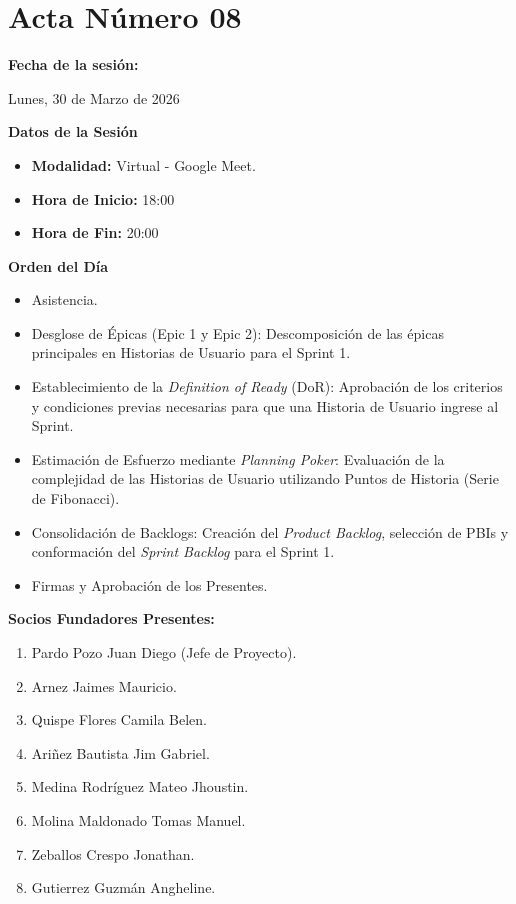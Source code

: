 \newpage
\section{Acta Número 08}
\label{sec:acta08}

\noindent \textbf{Fecha de la sesión:}\par
Lunes, 30 de Marzo de 2026

\vspace*{0.5cm}
\noindent \textbf{Datos de la Sesión}
\vspace{-0.2cm}
\begin{itemize}[noitemsep]
    \item \textbf{Modalidad:} Virtual - Google Meet.
    \item \textbf{Hora de Inicio:} 18:00
    \item \textbf{Hora de Fin:} 20:00
\end{itemize}

\vspace*{0.5cm}
\noindent \textbf{Orden del Día}
\vspace{-0.2cm}
\begin{itemize}[noitemsep]
    \item Asistencia.
    \item Desglose de Épicas (Epic 1 y Epic 2): Descomposición de las épicas principales en Historias de Usuario para el Sprint 1.
    \item Establecimiento de la \textit{Definition of Ready} (DoR): Aprobación de los criterios y condiciones previas necesarias para que una Historia de Usuario ingrese al Sprint.
    \item Estimación de Esfuerzo mediante \textit{Planning Poker}: Evaluación de la complejidad de las Historias de Usuario utilizando Puntos de Historia (Serie de Fibonacci).
    \item Consolidación de Backlogs: Creación del \textit{Product Backlog}, selección de PBIs y conformación del \textit{Sprint Backlog} para el Sprint 1.
    \item Firmas y Aprobación de los Presentes.
\end{itemize}

\vspace*{0.5cm}
\noindent \textbf{Socios Fundadores Presentes:}
\vspace{-0.2cm}
\begin{enumerate}[noitemsep]
    \item Pardo Pozo Juan Diego (Jefe de Proyecto).
    \item Arnez Jaimes Mauricio.
    \item Quispe Flores Camila Belen.
    \item Ariñez Bautista Jim Gabriel.
    \item Medina Rodríguez Mateo Jhoustin.
    \item Molina Maldonado Tomas Manuel.
    \item Zeballos Crespo Jonathan.
    \item Gutierrez Guzmán Angheline.
\end{enumerate}

